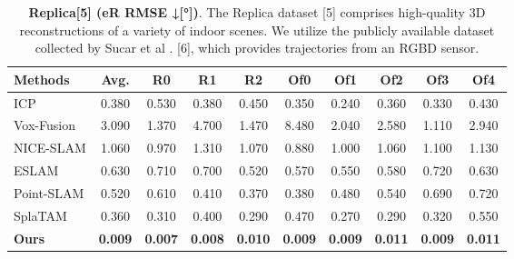 \documentclass[twocolumn]{article} %
\begin{document}
\begin{table}[htbp]
\centering
\caption{\textbf{Replica[5] (eR RMSE ↓[°])}. The Replica dataset [5] comprises high-quality 3D reconstructions of a variety of indoor scenes. We utilize the publicly available dataset collected by Sucar et al . [6], which provides trajectories from an RGBD sensor.}
\label{table:_textbf_replica_5_er}
\begin{adjustbox}{max width=\columnwidth,max height=!,center}
\begin{tabular}{lccccccccc}
\toprule
\textbf{Methods} & \textbf{Avg.} & \textbf{R0} & \textbf{R1} & \textbf{R2} & \textbf{Of0} & \textbf{Of1} & \textbf{Of2} & \textbf{Of3} & \textbf{Of4}\\
\midrule
ICP & \cellcolor{lime!50}0.380 & \cellcolor{lime!50}0.530 & \cellcolor{yellow!30}0.380 & 0.450 & \cellcolor{yellow!30}0.350 & \cellcolor{yellow!30}0.240 & \cellcolor{lime!50}0.360 & \cellcolor{lime!50}0.330 & \cellcolor{yellow!30}0.430\\
Vox-Fusion & 3.090 & 1.370 & 4.700 & 1.470 & 8.480 & 2.040 & 2.580 & 1.110 & 2.940\\
NICE-SLAM & 1.060 & 0.970 & 1.310 & 1.070 & 0.880 & 1.000 & 1.060 & 1.100 & 1.130\\
ESLAM & 0.630 & 0.710 & 0.700 & 0.520 & 0.570 & 0.550 & 0.580 & 0.720 & 0.630\\
Point-SLAM & 0.520 & 0.610 & 0.410 & \cellcolor{lime!50}0.370 & \cellcolor{lime!50}0.380 & 0.480 & 0.540 & 0.690 & 0.720\\
SplaTAM & \cellcolor{yellow!30}0.360 & \cellcolor{yellow!30}0.310 & \cellcolor{lime!50}0.400 & \cellcolor{yellow!30}0.290 & 0.470 & \cellcolor{lime!50}0.270 & \cellcolor{yellow!30}0.290 & \cellcolor{yellow!30}0.320 & \cellcolor{lime!50}0.550\\
\midrule
\textbf{Ours} & \cellcolor{green!30}\textbf{0.009} & \cellcolor{green!30}\textbf{0.007} & \cellcolor{green!30}\textbf{0.008} & \cellcolor{green!30}\textbf{0.010} & \cellcolor{green!30}\textbf{0.009} & \cellcolor{green!30}\textbf{0.009} & \cellcolor{green!30}\textbf{0.011} & \cellcolor{green!30}\textbf{0.009} & \cellcolor{green!30}\textbf{0.011}\\
\bottomrule
\end{tabular}
\end{adjustbox}
\end{table}
\end{document}

